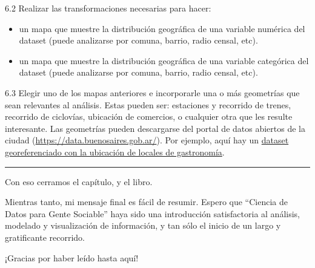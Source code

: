 \documentclass[spanish,]{book}
\begin{document}
6.2 Realizar las transformaciones necesarias para hacer:

\begin{itemize}
\item
  un mapa que muestre la distribución geográfica de una variable numérica del dataset (puede analizarse por comuna, barrio, radio censal, etc).
\item
  un mapa que muestre la distribución geográfica de una variable categórica del dataset (puede analizarse por comuna, barrio, radio censal, etc).
\end{itemize}

6.3 Elegir uno de los mapas anteriores e incorporarle una o más geometrías que sean relevantes al análisis. Estas pueden ser: estaciones y recorrido de trenes, recorrido de ciclovías, ubicación de comercios, o cualquier otra que les resulte interesante. Las geometrías pueden descargarse del portal de datos abiertos de la ciudad (\url{https://data.buenosaires.gob.ar/}). Por ejemplo, aquí hay un \href{https://data.buenosaires.gob.ar/dataset/oferta-establecimientos-gastronomicos}{dataset georeferenciado con la ubicación de locales de gastronomía}.

\begin{center}\rule{0.5\linewidth}{\linethickness}\end{center}

Con eso cerramos el capítulo, y el libro.

Mientras tanto, mi mensaje final es fácil de resumir. Espero que ``Ciencia de Datos para Gente Sociable'' haya sido una introducción satisfactoria al análisis, modelado y visualización de información, y tan sólo el inicio de un largo y gratificante recorrido.

¡Gracias por haber leído hasta aquí!


\end{document}

